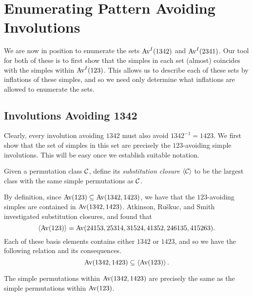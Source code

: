       




\section{Enumerating Pattern Avoiding Involutions}
\label{involutions:sec:enumerations}
  
  We are now in position to enumerate the sets $\operatorname{{Av}}^I(1342)$ and $\operatorname{{Av}}^I(2341)$.
  Our tool for both of these is to first show that the simples in each set
  (almost) coincides with the simples within $\operatorname{{Av}}^I(123)$. This allows us to
  describe each of these sets by inflations of these simples, and so we need
  only determine what inflations are allowed to enumerate the sets. 


  \subsection{Involutions Avoiding 1342}
  \label{involutions:sub:1342}

    Clearly, every involution avoiding $1342$ must also avoid $1342^{-1} =
    1423$. We first show that the set of simples in this set are precisely
    the $123$-avoiding simple involutions. This will be easy once we establish
    suitable notation. 

    \begin{definition} \label{involutions:def:subs-closure}
      Given a permutation class $\mathcal{C}$, define its \emph{substitution closure}
      $\left\langle \mathcal{C} \right\rangle$ to be the largest class with the same simple permutations as
      $\mathcal{C}$. 
    \end{definition}

    By definition, since $\operatorname{{Av}}(123) \subseteq \operatorname{{Av}}(1342, 1423)$, we have that
    the $123$-avoiding simples are contained in $\operatorname{{Av}}(1342, 1423)$.
    Atkinson, Ru\v{s}kuc, and Smith~\cite{Atkinson2011} investigated
    substitution closures, and found that 
    $$ \left\langle \operatorname{{Av}}(123) \right\rangle = \operatorname{{Av}}(24153, 25314, 31524, 41352, 246135, 415263).$$
    Each of these basis elements contains either $1342$ or $1423$, and so we
    have the following relation and its consequences. 
    $$ \operatorname{{Av}}(1342, 1423) \subseteq \left\langle \operatorname{{Av}}(123) \right\rangle.$$ 

    \begin{proposition} \label{involutions:prop:1342simpleperms}
      The simple permutations within $\operatorname{{Av}}(1342, 1423)$ are precisely the same
      as the simple permutations within $\operatorname{{Av}}(123)$. 
    \end{proposition}

